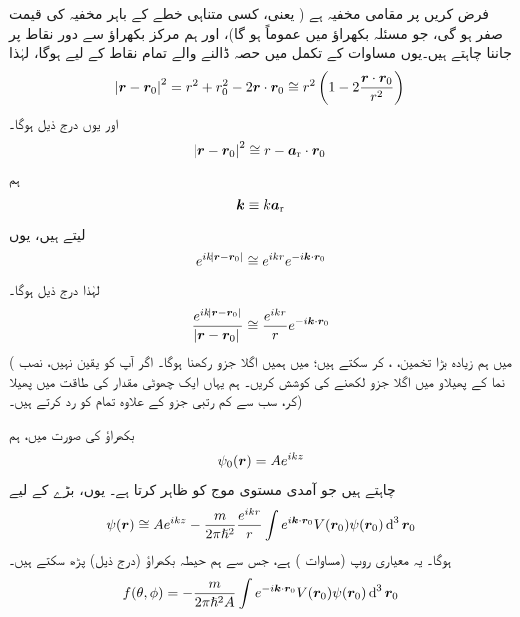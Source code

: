 فرض کریں  پر  مقامی مخفیہ ہے ( یعنی، کسی متناہی خطے کے باہر مخفیہ کی قیمت صفر ہو گی، جو مسئلہ بکھراؤ میں عموماً ہو گا)، اور ہم مرکز بکھراؤ سے دور نقاط پر  جاننا چاہتے ہیں۔یوں مساوات  کے تکمل میں حصہ ڈالنے والے تمام نقاط
 کے لیے  ہوگا، لہٰذا
\begin{align}
	\abs{{{\boldsymbol{r}}}-{{\boldsymbol{r}}}_0}^2 = r^2+r_0^2-2{{\boldsymbol{r}}}\cdot {\ensuremath{{\boldsymbol{r}}}}_0 \cong r^2\left(1-2\frac{{{\boldsymbol{r}}}\cdot {\ensuremath{{\boldsymbol{r}}}}_0}{r^2}\right)
\end{align}
اور یوں درج ذیل ہوگا۔
\begin{align}
	\abs{{{\boldsymbol{r}}}-{{\boldsymbol{r}}}_0}^2\cong r-{{\boldsymbol{a}}_{\textup{r}}}\cdot {\ensuremath{{\boldsymbol{r}}}}_0
\end{align}
ہم 
\begin{align}
	{\ensuremath{{\boldsymbol{k}}}}\equiv k{{\boldsymbol{a}}_{\textup{r}}}
\end{align}
لیتے ہیں، یوں
\begin{align}
	e^{ik\abs{{{\boldsymbol{r}}}-{{\boldsymbol{r}}}_0}}\cong e^{ikr}e^{-i{{\boldsymbol{k}}}\cdot {\ensuremath{{\boldsymbol{r}}}}_0}
\end{align}
 لہٰذا درج ذیل ہوگا۔
\begin{align}
	\frac{e^{ik\abs{{{\boldsymbol{r}}}-{{\boldsymbol{r}}}_0}}}{\abs{{{\boldsymbol{r}}}-{{\boldsymbol{r}}}_0}}\cong\frac{e^{ikr}}{r}e^{-i{{\boldsymbol{k}}}\cdot {\ensuremath{{\boldsymbol{r}}}}_0}
\end{align}
( میں ہم زیادہ بڑا تخمین، ، کر سکتے ہیں؛  میں ہمیں اگلا جزو رکھنا ہوگا۔ اگر آپ کو یقین نہیں، نصب نما کے پھیلاو میں اگلا جزو لکھنے کی کوشش کریں۔ ہم یہاں ایک چھوٹی مقدار  کی طاقت میں پھیلا کر، سب سے کم رتبی جزو کے علاوہ تمام کو رد کرتے ہیں۔)

بکھراؤ کی صورت میں، ہم
\begin{align}
	\psi_0({{\boldsymbol{r}}}) = Ae^{ikz}
\end{align}
 چاہتے ہیں جو آمدی مستوی موج کو ظاہر کرتا ہے۔ یوں، بڑے  کے لیے
\begin{align}
	\psi(\kvec{r})\cong Ae^{ikz}-\frac{m}{2\pi\hslash^2}\frac{e^{ikr}}{r}\int e^{i\kvec{k}\cdot \kvec{r}_0}V(\kvec{r}_0)\psi(\kvec{r}_0)\dif^{\,3}\kvec{r}_0
\end{align}
 ہوگا۔ یہ معیاری روپ (مساوات ) ہے، جس سے ہم حیطہ بکھراؤ (درج ذیل) پڑھ سکتے ہیں۔
\begin{align}
	f(\theta, \phi) = -\frac{m}{2\pi\hslash^2A}\int e^{-i\kvec{k}\cdot \kvec{r}_0}V(\kvec{r}_0)\psi(\kvec{r}_0)\dif^{\,3}\kvec{r}_0 
\end{align}

